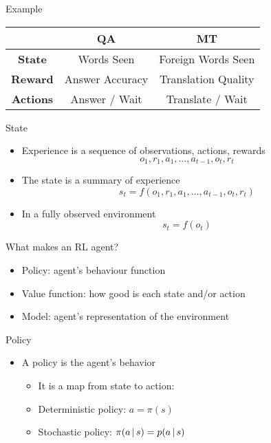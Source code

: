 \documentclass[compress]{beamer}
\begin{document}
\begin{frame}{Example}

\begin{tabular}{ccc}
\hline
  & QA & MT \\
\hline
{\bf State} & Words Seen & Foreign Words Seen \\
{\bf Reward} & Answer Accuracy & Translation Quality \\
{\bf Actions} & Answer / Wait & Translate / Wait \\
\hline
\end{tabular}


\end{frame}


\begin{frame}{State}

  \begin{itemize}
\item Experience is a sequence of observations, actions, rewards
\begin{equation}
o_1,r_1, a_1, \dots, a_{t−1}, o_t, r_t
\end{equation}
\item The state is a summary of experience
\begin{equation}
s_t = f (o_1, r_1, a_1, \dots, a_{t−1}, o_t, r_t)
\end{equation}
\item In a fully observed environment
\begin{equation}
s_t = f (o_t)
\end{equation}
  \end{itemize}

\end{frame}



\begin{frame}{What makes an RL agent?}

  \begin{itemize}
\item Policy: agent's behaviour function
\item Value function: how good is each state and/or action
\item Model: agent's representation of the environment
  \end{itemize}

\end{frame}



\begin{frame}{Policy}

  \begin{itemize}
\item A policy is the agent's behavior
  \begin{itemize}
\item  It is a map from state to action:
\item  Deterministic policy: $a = \pi(s)$
\item Stochastic policy: $\pi(a \, | \, s) = p(a \, | \, s)$
  \end{itemize}
  \end{itemize}
\end{frame}
\end{document}
